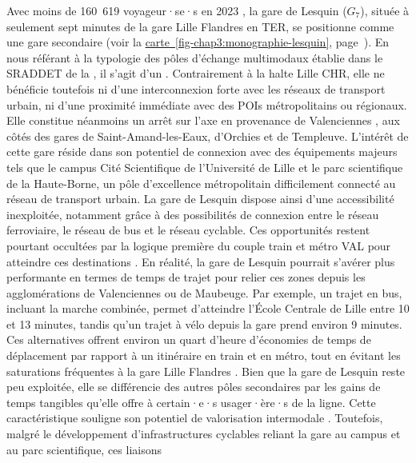 \begin{refsegment}
Avec moins de 160~619 voyageur·se·s en 2023 \textcolor{blue}{\autocite{sncf_frequentation_2024}}, la gare de Lesquin (\(G_7\)), située à seulement sept minutes de la gare Lille Flandres en \acrshort{TER}, se positionne comme une gare secondaire (voir la \hyperref[fig-chap3:monographie-lesquin]{carte~\ref{fig-chap3:monographie-lesquin}}, page~\pageref{fig-chap3:monographie-lesquin}). En nous référant à la typologie des pôles d'échange multimodaux établie dans le \acrshort{SRADDET} de la \textcolor{blue}{\textcite[83]{region_hauts-de-france_sraddet_2024}}, il s'agit d'un . Contrairement à la halte Lille CHR, elle ne bénéficie toutefois ni d’une interconnexion forte avec les réseaux de transport urbain, ni d’une proximité immédiate avec des \acrshort{POIs} métropolitains ou régionaux. Elle constitue néanmoins un arrêt sur l’axe  en provenance de Valenciennes \textcolor{blue}{\autocite[38]{menerault_analyse_2000}}, aux côtés des gares de Saint-Amand-les-Eaux, d'Orchies et de Templeuve. L'intérêt de cette gare réside dans son potentiel de connexion avec des équipements majeurs tels que le campus Cité Scientifique de l’Université de Lille et le parc scientifique de la Haute-Borne, un pôle d’excellence métropolitain difficilement connecté au réseau de transport urbain. La gare de Lesquin dispose ainsi d’une accessibilité inexploitée, notamment grâce à des possibilités de connexion entre le réseau ferroviaire, le réseau de bus et le réseau cyclable. Ces opportunités restent pourtant occultées par la logique première du couple train et métro \acrshort{VAL} pour atteindre ces destinations \textcolor{blue}{\autocite[18]{lhostis_definir_2010}}. En réalité, la gare de Lesquin pourrait s'avérer plus performante en termes de temps de trajet pour relier ces zones depuis les agglomérations de Valenciennes ou de Maubeuge. Par exemple, un trajet en bus, incluant la marche combinée, permet d’atteindre l’École Centrale de Lille entre 10 et 13 minutes, tandis qu’un trajet à vélo depuis la gare prend environ 9 minutes. Ces alternatives offrent environ un quart d'heure d'économies de temps de déplacement par rapport à un \gls{itinéraire} en train et en métro, tout en évitant les saturations fréquentes à la gare Lille Flandres \textcolor{blue}{\autocites[58]{menerault_analyse_2000}[14]{lhostis_definir_2010}}. Bien que la gare de Lesquin reste peu exploitée, elle se différencie des autres pôles secondaires par les gains de temps tangibles qu'elle offre à certain·e·s usager·ère·s de la ligne. Cette caractéristique souligne son potentiel de valorisation intermodale \textcolor{blue}{\autocite[62]{menerault_analyse_2000}}. Toutefois, malgré le développement d'infrastructures cyclables reliant la gare au campus et au parc scientifique, ces liaisons 
\end{refsegment}
